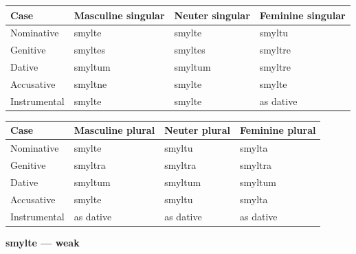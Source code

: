 \par\begingroup
\fontsize{10.5}{13.2}\selectfont
\setlength{\LTleft}{0pt}\setlength{\LTright}{\fill}
\noindent
\begin{tabular}{@{}>{\raggedright\arraybackslash}p{22.0mm}>{\raggedright\arraybackslash}p{31.188mm}>{\raggedright\arraybackslash}p{31.188mm}>{\raggedright\arraybackslash}p{31.188mm}@{}}
\toprule
\textbf{Case} & \textbf{Masculine singular} & \textbf{Neuter singular} & \textbf{Feminine singular} \\
\midrule
Nominative & smylte & smylte & smyltu \\
Genitive & smyltes & smyltes & smyltre \\
Dative & smyltum & smyltum & smyltre \\
Accusative & smyltne & smylte & smylte \\
Instrumental & smylte & smylte & as dative \\
\bottomrule
\end{tabular}
\par\endgroup
\par\addvspace{5pt}
\par\begingroup
\fontsize{10.5}{13.2}\selectfont
\setlength{\LTleft}{0pt}\setlength{\LTright}{\fill}
\noindent
\begin{tabular}{@{}>{\raggedright\arraybackslash}p{22.0mm}>{\raggedright\arraybackslash}p{31.188mm}>{\raggedright\arraybackslash}p{31.188mm}>{\raggedright\arraybackslash}p{31.188mm}@{}}
\toprule
\textbf{Case} & \textbf{Masculine plural} & \textbf{Neuter plural} & \textbf{Feminine plural} \\
\midrule
Nominative & smylte & smyltu & smylta \\
Genitive & smyltra & smyltra & smyltra \\
Dative & smyltum & smyltum & smyltum \\
Accusative & smylte & smyltu & smylta \\
Instrumental & as dative & as dative & as dative \\
\bottomrule
\end{tabular}
\par\endgroup

\textbf{smylte — weak}

